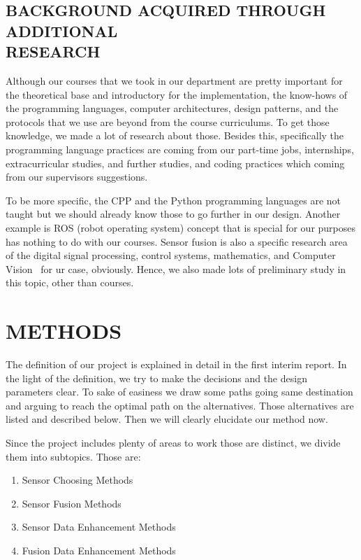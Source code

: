 \documentclass[12pt]{article}
\begin{document}
\subsection{BACKGROUND ACQUIRED THROUGH ADDITIONAL\\ RESEARCH}

Although our courses that we took in our department are pretty important for the theoretical base and introductory for the implementation, the know-hows of the programming languages, computer architectures, design patterns, and the protocols that we use are beyond from the course curriculums. To get those knowledge, we made a lot of research about those. Besides this, specifically the programming language practices are coming from our part-time jobs, internships, extracurricular studies, and further studies, and coding practices which coming from our supervisors suggestions.

To be more specific, the CPP and the Python programming languages are not taught but we should already know those to go further in our design. Another example is ROS (robot operating system) concept that is special for our purposes has nothing to do with our courses. Sensor fusion is also a specific research area of the digital signal processing, control systems, mathematics, and Computer Vision~\cite{enwiki:1120271364} for ur case, obviously. Hence, we also made lots of preliminary study in this topic, other than courses.


\section{METHODS}

The definition of our project is explained in detail in the first interim report. In the light of the definition, we try to make the decisions and the design parameters clear. To sake of easiness we draw some paths going same destination and arguing to reach the optimal path on the alternatives. Those alternatives are listed and described below. Then we will clearly elucidate our method now.

Since the project includes plenty of areas to work those are distinct, we divide them into subtopics. Those are:

\begin{enumerate}
    \item Sensor Choosing Methods
    \item Sensor Fusion Methods
    \item Sensor Data Enhancement Methods
    \item Fusion Data Enhancement Methods
\end{enumerate}
\end{document}
